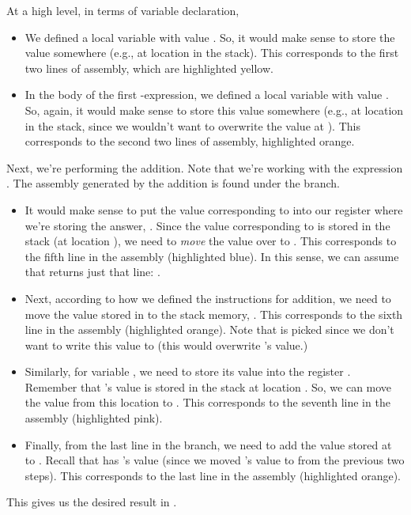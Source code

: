 \begin{mdframed}
    At a high level, in terms of variable declaration, 
    \begin{itemize}
        \item We defined a local variable  with value . So, it would make sense to store the value somewhere (e.g., at location  in the stack). This corresponds to the first two lines of assembly, which are highlighted yellow.
        \item In the body of the first -expression, we defined a local variable  with value . So, again, it would make sense to store this value somewhere (e.g., at location  in the stack, since we wouldn't want to overwrite the value at ). This corresponds to the second two lines of assembly, highlighted orange. 
    \end{itemize}
    Next, we're performing the addition. Note that we're working with the expression . The assembly generated by the addition is found under the  branch.   
    \begin{itemize}
        \item It would make sense to put the value corresponding to  into our register where we're storing the answer, . Since the value corresponding to  is stored in the stack (at location ), we need to \emph{move} the value over to . This corresponds to the fifth line in the assembly (highlighted blue). In this sense, we can assume that  returns just that line: .
        \item Next, according to how we defined the instructions for addition, we need to move the value stored in  to the stack memory, \code{[rsp - 32]}. This corresponds to the sixth line in the assembly (highlighted orange). Note that  is picked since we don't want to write this value to  (this would overwrite 's value.)
        \item Similarly, for variable , we need to store its value into the register . Remember that 's value is stored in the stack at location . So, we can move the value from this location to . This corresponds to the seventh line in the assembly (highlighted pink).
        \item Finally, from the last line in the  branch, we need to add the value stored at  to . Recall that \code{[rsp - 32]} has 's value (since we moved 's value to \code{[rsp - 32]} from the previous two steps). This corresponds to the last line in the assembly (highlighted orange).
    \end{itemize}
    This gives us the desired result in .
\end{mdframed}
